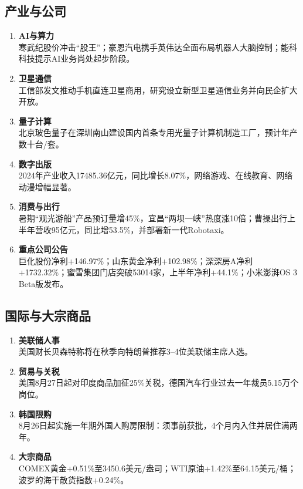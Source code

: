 \subsection{产业与公司}
\begin{enumerate}[leftmargin=*, nosep]
    \item \textbf{AI与算力}  \\
    寒武纪股价冲击“股王”；{\color{red}豪恩汽电}携手英伟达全面布局机器人大脑控制；{\color{red}能科科技}提示AI业务尚处起步阶段。
    \item \textbf{卫星通信}  \\
    工信部发文推动{\color{red}手机直连卫星商用}，研究设立新型卫星通信业务并向民企扩大开放。
    \item \textbf{量子计算}  \\
    {\color{red}北京玻色量子}在深圳南山建设国内首条专用光量子计算机制造工厂，预计年产数十台/套。
    \item \textbf{数字出版}  \\
    2024年产业收入17485.36亿元，同比增长8.07\%，网络游戏、在线教育、网络动漫增幅显著。
    \item \textbf{消费与出行}  \\
    暑期“观光游船”产品预订量增45\%，宜昌{\color{red}“两坝一峡”}热度涨10倍；曹操出行上半年营收95亿元，同比增53.5\%，并部署新一代Robotaxi。
    \item \textbf{重点公司公告}  \\
    巨化股份净利+146.97\%；山东黄金净利+102.98\%；深深房A净利+1732.32\%；{\color{red}蜜雪集团}门店突破53014家，上半年净利+44.1\%；{\color{red}小米澎湃OS 3 Beta版}发布。
\end{enumerate}

\subsection{国际与大宗商品}
\begin{enumerate}[leftmargin=*, nosep]
    \item \textbf{美联储人事}  \\
    {\color{red}美国财长贝森特}称将在秋季向特朗普推荐3–4位美联储主席人选。
    \item \textbf{贸易与关税}  \\
    美国8月27日起对印度商品加征25\%关税，德国汽车行业过去一年裁员5.15万个岗位。
    \item \textbf{韩国限购}  \\
    8月26日起实施一年期外国人购房限制：须事前获批，4个月内入住并居住满两年。
    \item \textbf{大宗商品}  \\
    COMEX黄金+0.51\%至3450.6美元/盎司；WTI原油+1.42\%至64.15美元/桶；波罗的海干散货指数+0.24\%。
\end{enumerate}

